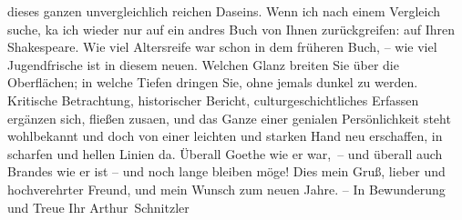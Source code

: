 \begin{ledgroupsized}[t]{13cm}
                        dieses ganzen unvergleichlich reichen Daseins. Wenn ich nach einem Vergleich
                        suche, ka{\geminationn} ich wieder nur auf ein andres
                        Buch von Ihnen zurückgreifen: auf Ihren Shakespeare. Wie viel Altersreife
                        war schon in dem früheren Buch, – wie viel Jugendfrische \introOben{}ist\introOben{} in diesem neuen. Welchen Glanz breiten Sie über
                        die Oberflächen; in welche Tiefen dringen Sie, ohne jemals dunkel zu werden.
                        {\pb}Kritische Betrachtung,
                        historischer Bericht, culturgeschichtliches Erfassen ergänzen sich, fließen
                        zusa{\geminationm}en, und das Ganze einer genialen
                        Persönlichkeit steht wohlbekannt und doch von einer leichten und starken
                        Hand neu erschaffen, in scharfen und hellen Linien da. Überall Goethe wie er
                        war, – und überall auch Brandes wie er ist – und noch lange bleiben möge!
                        Dies mein Gruß, lieber und hochverehrter Freund, und mein Wunsch zum neuen
                        Jahre. – In Bewunderung und Treue\pend
           \pstart Ihr \spacefill\mbox{Arthur Schnitzler}\pend{}
         
         \endnumbering{}\end{ledgroupsized}  \newcommand{\dateiname}{L02372}\newcommand{\titel}{Arthur Schnitzler an Georg Brandes, 28. 12. 1921}\newcommand{\editorInnen}{Martin Anton Müller und Gerd-Hermann Susen}
      